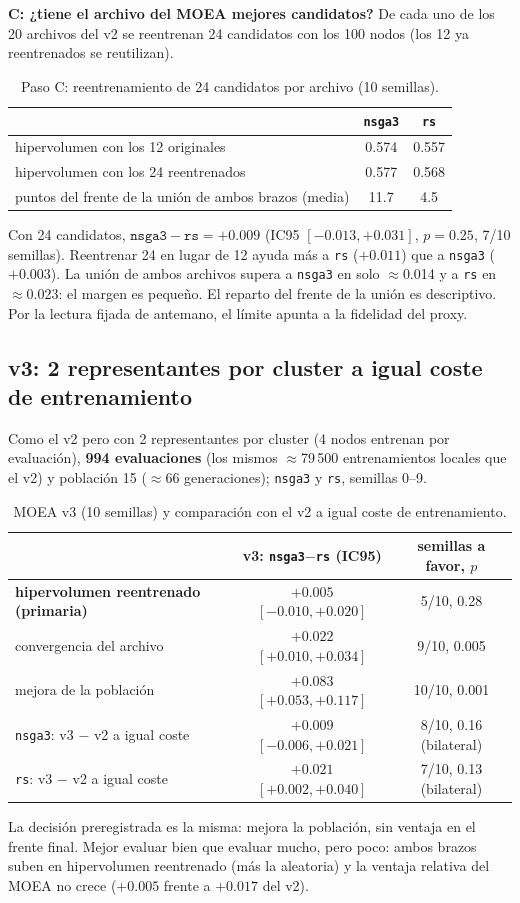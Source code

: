 \documentclass[11pt,a4paper]{article}
\begin{document}
\textbf{C: ¿tiene el archivo del MOEA mejores candidatos?} De cada uno de los 20 archivos del v2 se reentrenan 24 candidatos con los 100 nodos (los 12 ya reentrenados se reutilizan).
\begin{table}[h]
\centering\small
\begin{tabular}{lcc}
\toprule
 & \texttt{nsga3} & \texttt{rs}\\
\midrule
hipervolumen con los 12 originales & 0.574 & 0.557\\
hipervolumen con los 24 reentrenados & 0.577 & 0.568\\
puntos del frente de la unión de ambos brazos (media) & 11.7 & 4.5\\
\bottomrule
\end{tabular}
\caption{Paso C: reentrenamiento de 24 candidatos por archivo (10 semillas).}
\label{tab:C}
\end{table}
Con 24 candidatos, $\texttt{nsga3}-\texttt{rs}=+0.009$ (IC95 $[-0.013,+0.031]$, $p=0.25$, 7/10 semillas). Reentrenar 24 en lugar de 12 ayuda más a \texttt{rs} ($+0.011$) que a \texttt{nsga3} ($+0.003$). La unión de ambos archivos supera a \texttt{nsga3} en solo $\approx$0.014 y a \texttt{rs} en $\approx$0.023: el margen es pequeño. El reparto del frente de la unión es descriptivo. Por la lectura fijada de antemano, el límite apunta a la fidelidad del proxy.

\subsection*{v3: 2 representantes por cluster a igual coste de entrenamiento}
Como el v2 pero con 2 representantes por cluster (4 nodos entrenan por evaluación), \textbf{994 evaluaciones} (los mismos $\approx$79\,500 entrenamientos locales que el v2) y población 15 ($\approx$66 generaciones); \texttt{nsga3} y \texttt{rs}, semillas 0--9.
\begin{table}[h]
\centering\small
\begin{tabular}{lcc}
\toprule
 & v3: \texttt{nsga3}$-$\texttt{rs} (IC95) & semillas a favor, $p$\\
\midrule
\textbf{hipervolumen reentrenado (primaria)} & $+0.005$ $[-0.010,+0.020]$ & 5/10, 0.28\\
convergencia del archivo & $+0.022$ $[+0.010,+0.034]$ & 9/10, 0.005\\
mejora de la población & $+0.083$ $[+0.053,+0.117]$ & 10/10, 0.001\\
\midrule
\texttt{nsga3}: v3 $-$ v2 a igual coste & $+0.009$ $[-0.006,+0.021]$ & 8/10, 0.16 (bilateral)\\
\texttt{rs}: v3 $-$ v2 a igual coste & $+0.021$ $[+0.002,+0.040]$ & 7/10, 0.13 (bilateral)\\
\bottomrule
\end{tabular}
\caption{MOEA v3 (10 semillas) y comparación con el v2 a igual coste de entrenamiento.}
\label{tab:v3}
\end{table}
La decisión preregistrada es la misma: mejora la población, sin ventaja en el frente final. Mejor evaluar bien que evaluar mucho, pero poco: ambos brazos suben en hipervolumen reentrenado (más la aleatoria) y la ventaja relativa del MOEA no crece ($+0.005$ frente a $+0.017$ del v2).
\end{document}
